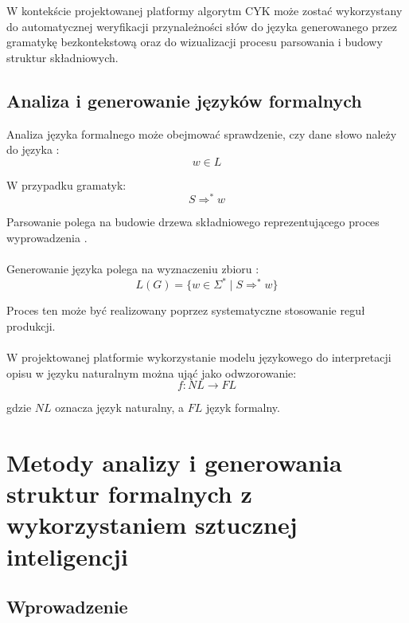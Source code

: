 \documentclass[12pt]{article}
\begin{document}
W kontekście projektowanej platformy algorytm CYK może zostać wykorzystany do automatycznej weryfikacji przynależności słów do języka generowanego przez gramatykę bezkontekstową oraz do wizualizacji procesu parsowania i budowy struktur składniowych.

\subsection{Analiza i generowanie języków formalnych}

Analiza języka formalnego może obejmować sprawdzenie, czy dane słowo należy do języka \cite{hopcroft2007,sipser2012}:
\begin{equation}
w \in L
\end{equation}

W przypadku gramatyk:
\begin{equation}
S \Rightarrow^* w
\end{equation}

Parsowanie polega na budowie drzewa składniowego reprezentującego proces wyprowadzenia \cite{aho1972}.
\\ \\
Generowanie języka polega na wyznaczeniu zbioru \cite{hopcroft2007,linz2016}:
\begin{equation}
L(G) = \{ w \in \Sigma^* \mid S \Rightarrow^* w \}
\end{equation}

Proces ten może być realizowany poprzez systematyczne stosowanie reguł produkcji.
\\
\\
W projektowanej platformie wykorzystanie modelu językowego do interpretacji opisu w języku naturalnym można ująć jako odwzorowanie:
\begin{equation}
f: NL \rightarrow FL
\end{equation}

gdzie $NL$ oznacza język naturalny, a $FL$ język formalny.

\newpage

\section{Metody analizy i generowania struktur formalnych z wykorzystaniem sztucznej inteligencji}

\subsection{Wprowadzenie}
\end{document}
